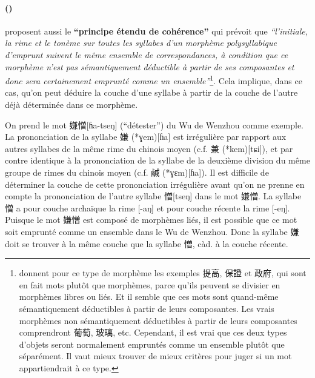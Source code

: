\documentclass{scrbook}
\newcounter{c}[subsubsection]
\newcommand{\stpc}[1]{\stepcounter{#1}}
\begin{document}
\begin{sloppypar}
\stpc{c}\paragraph{()}
\textcite[16--17]{Sagart2001hani} proposent aussi le \textbf{``principe étendu de cohérence''} qui prévoit que \textit{``l'initiale, la rime et le tonème sur toutes les syllabes d'un morphème polysyllabique d'emprunt suivent le même ensemble de correspondances, à condition que ce morphème n'est pas sémantiquement déductible à partir de ses composantes et donc sera certainement emprunté comme un ensemble''}\footnote{\citeauthor{Sagart2001hani} donnent pour ce type de morphème les exemples 提高, 保證 et 政府, qui sont en fait mots plutôt que morphèmes, parce qu'ils peuvent se divisier en morphèmes libres ou liés. Et il semble que ces mots sont quand-même sémantiquement déductibles à partir de leurs composantes. Les vrais morphèmes non sémantiquement déductibles à partir de leurs composantes comprendront 葡萄, 玻璃, etc. Cependant, il est vrai que ces deux types d'objets seront normalement empruntés comme un ensemble plutôt que séparément. Il vaut mieux trouver de mieux critères pour juger si un mot appartiendrait à ce type.}. Cela implique, dans ce cas, qu'on peut déduire la couche d'une syllabe à partir de la couche de l'autre déjà déterminée dans ce morphème. 

On prend le mot 嫌憎[ɦa-tseŋ] (``détester'') du Wu de Wenzhou comme exemple. La prononciation de la syllabe 嫌 (*ɣem)[ɦa] est irrégulière par rapport aux autres syllabes de la même rime du chinois moyen (c.f. 兼 (*kem)[tɕi]), et par contre identique à la prononciation de la syllabe de la deuxième division du même groupe de rimes du chinois moyen (c.f. 鹹 (*ɣɛm)[ɦa]). Il est difficile de déterminer la couche de cette prononciation irrégulière avant qu'on ne prenne en compte la prononciation de l'autre syllabe 憎[tseŋ] dans le mot 嫌憎. La syllabe 憎 a pour couche archaïque la rime [-aŋ] et pour couche récente la rime [-eŋ]. Puisque le mot 嫌憎 est composé de morphèmes liés, il est possible que ce mot soit emprunté comme un ensemble dans le Wu de Wenzhou. Donc la syllabe 嫌 doit se trouver à la même couche que la syllabe 憎, càd. à la couche récente.%


\end{sloppypar}
\end{document}
